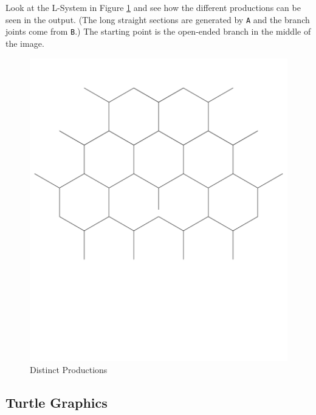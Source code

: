 \documentclass[12pt,twoside]{reedthesis}
\newcommand{\code}[1]{\texttt{#1}}
\begin{document}
 Look at the L-System in Figure \ref{HexUnderstanding} and see how the different productions can be seen in the output. (The long straight sections are generated by \code{A} and the branch joints come from \code{B}.) The starting point is the open-ended branch in the middle of the image.

	\begin{figure}[H]
	\centering
	\includegraphics[clip=true, viewport=0in 4in 10in 11in, scale=0.5]{Images/UnderstandingThroughImages2}
	\caption[Distinct Productions]{Distinct Productions\footnotemark}
	\label {HexUnderstanding}
	\end{figure}

\subsection{Turtle Graphics}
\label{Turtle-Graphics}
\end{document}
